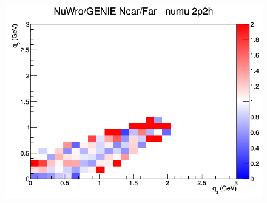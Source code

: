 \begin{figure}[h]
\endminipage
{}
\includegraphics[width=\linewidth]{eff_q0_q3/FGT/ratios/2p2h_NuWro_GENIE_numu_NF_q3_q0.png}
\endminipage
\newline
\end{figure}
\clearpage
